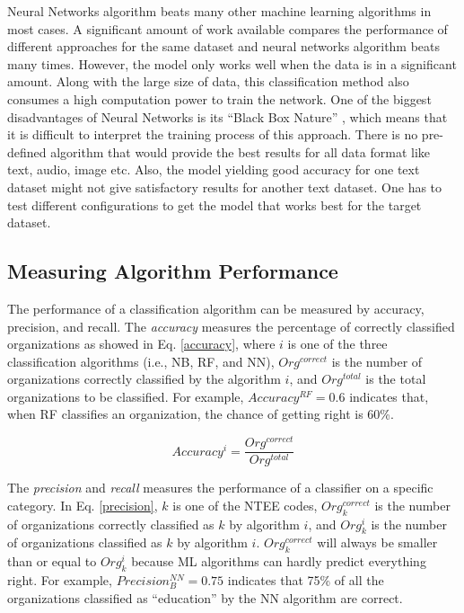 \documentclass[12pt]{article}
\begin{document}
Neural Networks algorithm beats many other machine learning algorithms in most cases. A significant amount of work available compares the performance of different approaches for the same dataset and neural networks algorithm beats many times. However, the model only works well when the data is in a significant amount. Along with the large size of data, this classification method also consumes a high computation power to train the network. One of the biggest disadvantages of Neural Networks is its ``Black Box Nature'' \parencites{benitez1997artificial}, which means that it is difficult to interpret the training process of this approach. There is no pre-defined algorithm that would provide the best results for all data format like text, audio, image etc. Also, the model yielding good accuracy for one text dataset might not give satisfactory results for another text dataset.  One has to test different configurations to get the model that works best for the target dataset.

\subsection{Measuring Algorithm Performance}

The performance of a classification algorithm can be measured by {accuracy}, {precision}, and {recall}. The \textit{accuracy} measures the percentage of correctly classified organizations as showed in Eq. \ref{accuracy}, where $i$ is one of the three classification algorithms (i.e., NB, RF, and NN), $Org^{correct}$ is the number of organizations correctly classified by the algorithm $i$, and $Org^{total}$ is the total organizations to be classified. For example, $Accuracy^{RF}=0.6$ indicates that, when RF classifies an organization, the chance of getting right is 60\%.

\begin{equation} \label{accuracy}
    Accuracy^i=\frac{Org^{correct}}{Org^{total}}
\end{equation}

The \textit{precision} and \textit{recall} measures the performance of a classifier on a specific category. In Eq. \ref{precision}, $k$ is one of the NTEE codes, $Org^{correct}_{k}$ is the number of organizations correctly classified as $k$ by algorithm $i$, and ${Org^{i}_{k}}$ is the number of organizations classified as $k$ by algorithm $i$. $Org^{correct}_{k}$ will always be smaller than or equal to ${Org^{i}_{k}}$ because ML algorithms can hardly predict everything right. For example, $Precision^{NN}_{B}=0.75$ indicates that 75\% of all the organizations classified as ``education'' by the NN algorithm are correct.
\end{document}
